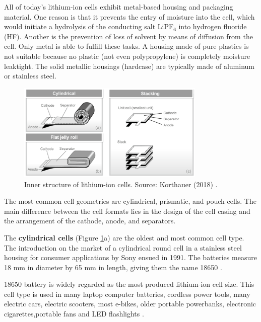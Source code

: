 All of today's lithium-ion cells exhibit metal-based housing and packaging material. One reason is that it prevents the entry of moisture into the cell, which would initiate a hydrolysis of the conducting salt LiPF$_6$ into hydrogen fluoride (HF). Another is the prevention of loss of solvent by means of diffusion from the cell. Only metal is able to fulfill these tasks. A housing made of pure plastics is not suitable because no plastic (not even polypropylene) is completely moisture leaktight. The solid metallic housings (hardcase) are typically made of aluminum or stainless steel.

\begin{figure}[ht]
    \centering
    \includegraphics[width=0.8\textwidth]{Images/Chapter1/geometries.png}
    \caption[Inner structure of lithium-ion cells]{Inner structure of lithium-ion cells. Source: Korthauer (2018) \cite{korthauer2018lithium}.}
    \label{fig:geometries}
\end{figure}

The most common cell geometries are cylindrical, prismatic, and pouch cells. The main difference between the cell formats lies in the design of the cell casing and the arrangement of the cathode, anode, and separators. 

The \textbf{cylindrical cells} (Figure \ref{fig:geometries}a) are the oldest and most common cell type. The introduction on the market of a cylindrical round cell in a stainless steel housing for consumer applications by Sony ensued in 1991. The batteries measure 18 mm in diameter by 65 mm in length, giving them the name 18650 \cite{korthauer2018lithium}.

18650 battery is widely regarded as the most produced lithium-ion cell size. This cell type is used in many laptop computer batteries, cordless power tools, many electric cars, electric scooters, most e-bikes, older portable powerbanks, electronic cigarettes,portable fans and LED flashlights \cite{batterytypes}.

